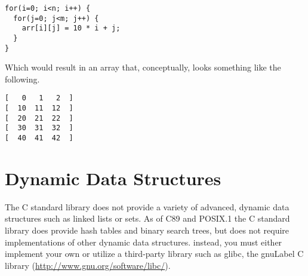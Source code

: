 \begin{verbatim}
for(i=0; i<n; i++) {
  for(j=0; j<m; j++) {
    arr[i][j] = 10 * i + j;
  }
}
\end{verbatim}

Which would result in an array that, conceptually, looks something like
the following.

\begin{verbatim}
[   0   1   2  ]
[  10  11  12  ]
[  20  21  22  ]
[  30  31  32  ]
[  40  41  42  ]
\end{verbatim}

\section{Dynamic Data Structures}

The C standard library does not provide a variety of advanced, dynamic
data structures such as linked lists or sets.  As of C89 and POSIX.1 the
C standard library does provide hash tables and binary search trees, but
does not require implementations of other dynamic data structures.
instead, you must either implement your own or utilize a third-party 
library such as glibc, the \gls{gnuLabel} C library 
(\url{http://www.gnu.org/software/libc/}).





